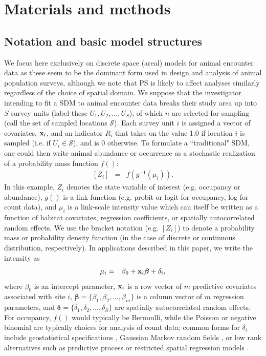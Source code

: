\documentclass[times,mee,doublespace,]{besauth2}
\begin{document}
\section{Materials and methods}


\subsection{Notation and basic model structures}

We focus here exclusively on discrete space (areal) models for animal encounter data as these seem to be the dominant form used in design and analysis of animal population surveys, although we note that PS is likely to affect analyses similarly regardless of the choice of spatial domain.  We suppose that the investigator intending to fit a SDM to animal encounter data breaks their study area up into $S$ survey units (label these $U_1, U_2, \hdots, U_S$), of which $n$ are selected for sampling (call the set of sampled locations $\mathcal{S}$). Each survey unit $i$ is assigned a vector of covariates, ${\bf x}_i$, and an indicator $R_i$ that takes on the value 1.0 if location $i$ is sampled (i.e. if $U_i \in \mathcal{S}$), and is 0 otherwise.  To formulate a ``traditional" SDM, one could then write animal abundance or occurrence as a stochastic realization of a probability mass function $f()$:
\begin{eqnarray}
  \label{eq:process}
  [Z_i] & = & f(g^{-1}(\mu_i)).
\end{eqnarray}
In this example, $Z_i$ denotes the state variable of interest (e.g. occupancy or abundance), $g()$ is a link function (e.g. probit or logit for occupancy, log for count data), and $\mu_i$ is a link-scale intensity value which can itself be written as a function of habitat covariates, regression coefficients, or spatially autocorrelated random effects.  We use the bracket notation (e.g. $[Z_i]$) to denote a probability mass or probability density function (in the case of discrete or continuous distribution, respectively). In applications described in this paper, we write the intensity as
\begin{eqnarray}
\mu_i & = & \beta_0 + {\bf x}_i \boldsymbol{\beta}+\delta_i,
 \label{eq:mu}
\end{eqnarray}
where $\beta_0$ is an intercept parameter, ${\bf x}_i$ is a row vector of $m$ predictive covariates associated with site $i$, $\boldsymbol{\beta} = \{ \beta_1, \beta_2, \hdots, \beta_m \}$ is a column vector of $m$ regression parameters, and $\boldsymbol{\delta}=\{ \delta_1,\delta_2,\hdots,\delta_S \}$ are spatially autocorrelated random effects.  For occupancy, $f()$ would typically be Bernoulli, while the Poisson or negative binomial are typically choices for analysis of count data; common forms for $\delta_i$ include geostatistical specifications \citep{Cressie1993,DiggleEtAl1998}, Gaussian Markov random fields \citep[e.g. conditionally autoregressive models;][]{RueHeld2005}, or low rank alternatives such as predictive process \citep{BanerjeeEtAl2008,LatimerEtAl2009} or restricted spatial regression models \citep{Reich2006,Hughes2013}.
\end{document}
